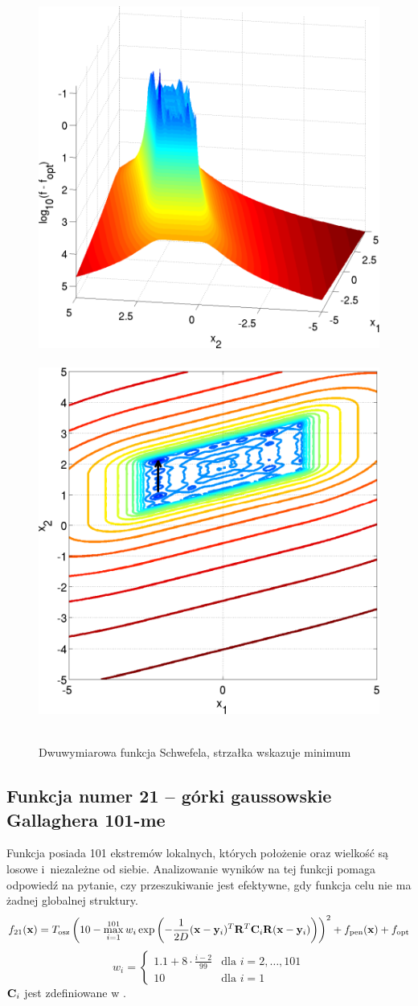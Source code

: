 \documentclass[a4paper,onecolumn,oneside,12pt,wide,floatssmall]{mwrep}
\theoremstyle{definition}
\theoremstyle{plain}%
\theoremstyle{remark}
\begin{document}
\begin{figure}[H]
\centering
\mbox{
\includegraphics[width=.45\textwidth]{img/20.png} \quad
\includegraphics[width=.45\textwidth]{img/20a.png} 
}
\caption{Dwuwymiarowa funkcja Schwefela, strzałka wskazuje minimum \cite{noiseless}}
\end{figure}

\subsection{Funkcja numer 21 -- górki gaussowskie Gallaghera 101-me}

Funkcja posiada 101 ekstremów lokalnych, których położenie oraz wielkość są losowe i~niezależne od siebie.
Analizowanie wyników na tej funkcji pomaga odpowiedź na pytanie, czy przeszukiwanie jest efektywne, 
gdy funkcja celu nie ma żadnej globalnej struktury.
$$ f_{21}(\bold{x}) = T_\text{osz}\left(10-\max_{i=1}^{101}w_i\exp\left(-\frac{1}{2D}(\bold{x}-\bold{y}_i)^T\bold{R}^T\bold{C}_i\bold{R}(\bold{x}-\bold{y}_i)\right)\right)^2 + f_\text{pen}(\bold{x}) + f_\text{opt} $$
\[
w_i =
\begin{cases} 
1.1 + 8 \cdot \frac{i-2}{99} & \mbox{dla } i = 2, \dots, 101 \\ 
10 & \mbox{dla } i = 1
\end{cases}
\] 
$\bold{C}_i$ jest zdefiniowane w \cite{noiseless}. 
\end{document}
